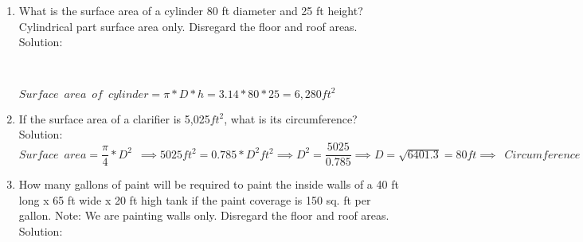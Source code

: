 \documentclass{article}
\begin{document}
\begin{enumerate}
\item What is the surface area of a cylinder 80 ft diameter and 25 ft height?  Cylindrical part surface area only. Disregard the floor and roof areas.\\
Solution:\\
\begin{center}
\\
\end{center}
$Surface \enspace area \enspace of \enspace cylinder=\pi*D*h=3.14*80*25=\boxed{6,280ft^2}$

\item If the surface area of a clarifier is 5,025$ft^2$, what is its circumference?\\
Solution:\\
$Surface \enspace area=\dfrac{\pi}{4}*D^2 \enspace \implies 5025ft^2=0.785*D^2 ft^2\implies D^2=\dfrac{5025}{0.785} \implies D=\sqrt{6401.3}=80ft \implies \enspace Circumference=\pi*D=3.14*80ft=\boxed{251ft}$

\item How many gallons of paint will be required to paint the inside walls of a 40 ft long x 65 ft wide x 20 ft high tank if the paint coverage is 150 sq. ft per gallon.  Note:  We are painting walls only.  Disregard the floor and roof areas.\\
Solution:\\
\begin{center}
\begin{tikzpicture}
      

\end{tikzpicture}
\end{center}
\end{enumerate}
\end{document}
